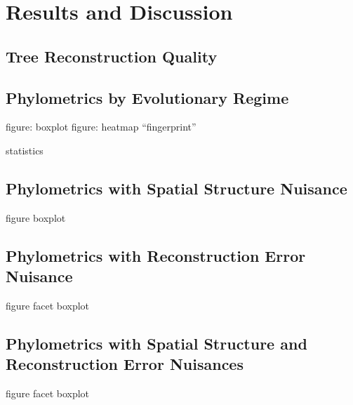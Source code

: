 \section{Results and Discussion} \label{sec:results}

\subsection{Tree Reconstruction Quality}

\subsection{Phylometrics by Evolutionary Regime}

figure: boxplot
figure: heatmap ``fingerprint''

statistics

\subsection{Phylometrics with Spatial Structure Nuisance}

figure boxplot

\subsection{Phylometrics with Reconstruction Error Nuisance}

figure facet boxplot

\subsection{Phylometrics with Spatial Structure and Reconstruction Error Nuisances}

figure facet boxplot